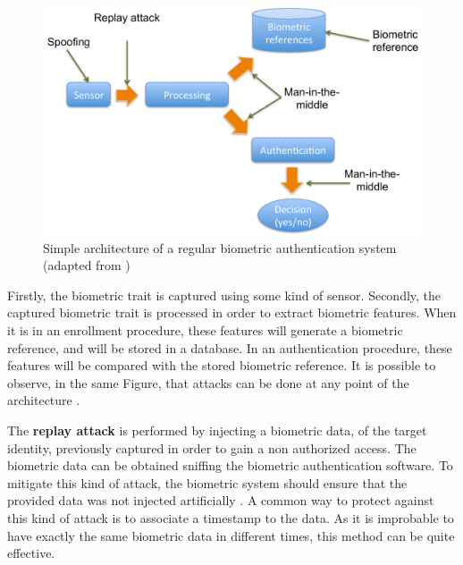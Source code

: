 \begin{figure}[!htb]
\begin{center}
\includegraphics [width=14cm] {images/diagram_attacks.pdf}
\caption[Simple architecture of a regular biometric authentication system]{Simple architecture of a regular biometric authentication system (adapted from \cite{xiao2005security})} \label{fig:diagram_attacks}
\end{center}
\end{figure}

Firstly, the biometric trait is captured using some kind of sensor. Secondly, the captured biometric trait is processed in order to extract biometric features. When it is in an enrollment procedure, these features will generate a biometric reference, and will be stored in a database. In an authentication procedure, these features will be compared with the stored biometric reference. It is possible to observe, in the same Figure, that attacks can be done at any point of the architecture \cite{xiao2005security}. 


The \textbf{replay attack} is performed by injecting a biometric data, of the target identity, previously captured in order to gain a non authorized access. The biometric data can be obtained sniffing the biometric authentication software. To mitigate this kind of attack, the biometric system should ensure that the provided data was not injected artificially \cite{xiao2005security}. A common way to protect against this kind of attack is to associate a timestamp to the data. As it is improbable to have exactly the same biometric data in different times, this method can be quite effective.

